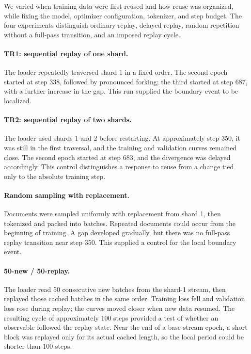 We varied when training data were first reused and how reuse was organized, while fixing the model, optimizer configuration, tokenizer, and step budget. The four experiments distinguish ordinary replay, delayed replay, random repetition without a full-pass transition, and an imposed replay cycle.

\paragraph{TR1: sequential replay of one shard.}
The loader repeatedly traversed shard 1 in a fixed order. The second epoch started at step 338, followed by pronounced forking; the third started at step 687, with a further increase in the gap. This run supplied the boundary event to be localized.

\paragraph{TR2: sequential replay of two shards.}
The loader used shards 1 and 2 before restarting. At approximately step 350, it was still in the first traversal, and the training and validation curves remained close. The second epoch started at step 683, and the divergence was delayed accordingly. This control distinguishes a response to reuse from a change tied only to the absolute training step.

\paragraph{Random sampling with replacement.}
Documents were sampled uniformly with replacement from shard 1, then tokenized and packed into batches. Repeated documents could occur from the beginning of training. A gap developed gradually, but there was no full-pass replay transition near step 350. This supplied a control for the local boundary event.

\paragraph{50-new / 50-replay.}
The loader read 50 consecutive new batches from the shard-1 stream, then replayed those cached batches in the same order. Training loss fell and validation loss rose during replay; the curves moved closer when new data resumed. The resulting cycle of approximately 100 steps provided a test of whether an observable followed the replay state. Near the end of a base-stream epoch, a short block was replayed only for its actual cached length, so the local period could be shorter than 100 steps.

